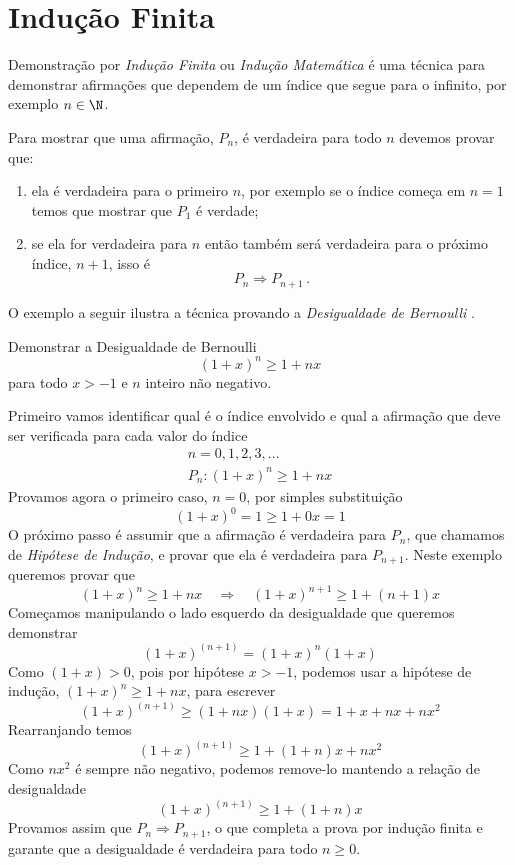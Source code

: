 \section{Indução Finita}
\label{sec:Inducao-Finita}

Demonstração por \emph{Indução Finita}
ou
\emph{Indução Matemática}
é uma técnica para demonstrar afirmações que dependem de um índice que segue para
o infinito, por exemplo $n\in\N$.

Para mostrar que uma afirmação, $P_n$, é verdadeira para todo $n$ devemos provar que:
\begin{enumerate}
	\item ela é verdadeira para o primeiro $n$, por exemplo se o índice começa em $n=1$
    temos que mostrar que $P_1$ é verdade;
	\item se ela for verdadeira para $n$ então também será verdadeira para o próximo
    índice, $n+1$, isso é
    \[
      P_n \Rightarrow P_{n+1} \,.
    \]
\end{enumerate}

O exemplo a seguir ilustra a técnica provando a
\emph{Desigualdade de Bernoulli}%
%
.

\begin{example}
  \label{ex:Desigualdade_de_Bernoulli}
  Demonstrar a Desigualdade de Bernoulli
  \[
    (1+x)^n \geq 1 + n x
  \]
  para todo $x>-1$ e $n$ inteiro não negativo.

  \solution
  Primeiro vamos identificar qual é o índice envolvido e qual a afirmação
  que deve ser verificada para cada valor do índice
  \begin{gather*}
    n = 0, 1, 2, 3, \dots \\
    P_n\colon (1+x)^n \geq 1 + n x
  \end{gather*}
  Provamos agora o primeiro caso, $n=0$, por simples substituição
  \[
    (1+x)^0 = 1 \geq 1 + 0x = 1
  \]
  O próximo passo é assumir que a afirmação é verdadeira para $P_n$,
  que chamamos de \emph{Hipótese de Indução},
  e provar que ela é verdadeira para $P_{n+1}$.
  Neste exemplo queremos provar que
  \[
    (1+x)^n \geq 1 + nx \quad\Rightarrow\quad (1+x)^{n+1} \geq 1 + (n+1) x
  \]
  Começamos manipulando o lado esquerdo da desigualdade que queremos demonstrar
  \[
    (1+x)^{(n+1)} = (1+x)^{n}(1+x)
  \]
  Como $(1+x)>0$, pois por hipótese $x>-1$, podemos usar a hipótese de indução,
  $(1+x)^n \geq 1 + nx$, para escrever
  \[
    (1+x)^{(n+1)}
    \geq (1 + nx)(1 + x)
    = 1 + x + nx + nx^2
  \]
  Rearranjando temos
  \[
    (1+x)^{(n+1)}
    \geq 1 + (1 + n)x + nx^2
  \]
  Como $nx^2$ é sempre não negativo, podemos remove-lo mantendo a relação de desigualdade
  \[
    (1+x)^{(n+1)}
    \geq 1 + (1 + n)x
  \]
  Provamos assim que $P_n\Rightarrow P_{n+1}$, o que completa a prova por indução finita
  e garante que a desigualdade é verdadeira para todo $n\geq 0$.
\end{example}






